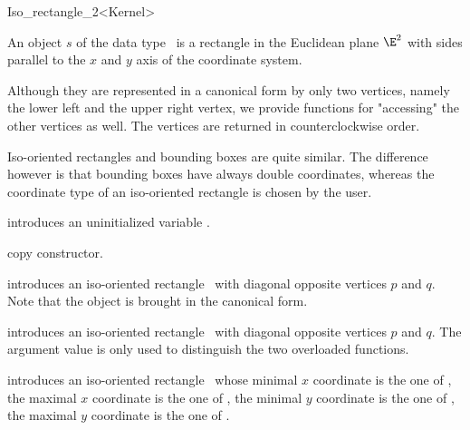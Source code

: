 \begin{ccRefClass} {Iso_rectangle_2<Kernel>}

\ccDefinition  An object $s$ of the data type \ccRefName\ is a
rectangle in the Euclidean plane $\E^2$ with sides parallel to the $x$ and
$y$ axis of the coordinate system.
 
Although they are represented in a canonical form by only two
vertices, namely the lower left and the upper right vertex, we provide
functions for "accessing" the other vertices as well. The vertices
are returned in counterclockwise order.

Iso-oriented rectangles and bounding boxes are quite similar. The
difference however is that bounding boxes have always double coordinates, 
whereas the coordinate type of an iso-oriented rectangle is chosen by
the user.

\ccCreation
{}


\ccHidden {}
             {introduces an uninitialized variable \ccVar.}

\ccHidden {}
            {copy constructor.}

            {introduces an iso-oriented rectangle \ccVar\ with diagonal
             opposite vertices $p$ and $q$. Note that the object is 
             brought in the canonical form.}

            {introduces an iso-oriented rectangle \ccVar\ with diagonal
             opposite vertices $p$ and $q$.  The  argument value
             is only used to distinguish the two overloaded functions.
             }


            {introduces an iso-oriented rectangle \ccVar\ whose
             minimal $x$ coordinate is the one of , the
             maximal $x$ coordinate is the one of , the
             minimal $y$ coordinate is the one of , the
             maximal $y$ coordinate is the one of .}


\end{ccRefClass}
